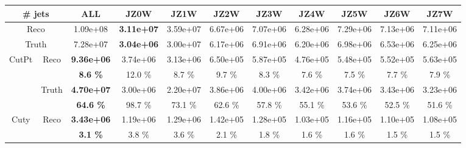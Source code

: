 \begin{appendices}
\begin{landscape} 
\begin{table}
  \small
  \centering
  \begin{tabular}{|c|c|>{\bfseries}c|c|c|c|c|c|c|c|c|}
    \hline
     \multicolumn{2}{|c|}{\# jets}  & ALL      & JZ0W     & JZ1W     & JZ2W     & JZ3W     & JZ4W     & JZ5W     & JZ6W     & JZ7W     \\
    \hline                                                              
    \hline                                                              
     \multicolumn{2}{|c|}{Reco}                               & 1.09e+08 & 3.11e+07 & 3.59e+07 & 6.67e+06 & 7.07e+06 & 6.28e+06 & 7.29e+06 & 7.13e+06 & 7.11e+06 \\
    \hline                                                                                          
     \multicolumn{2}{|c|}{Truth}                                & 7.28e+07 & 3.04e+06 & 3.00e+07 & 6.17e+06 & 6.91e+06 & 6.20e+06 & 6.98e+06 & 6.53e+06 & 6.25e+06 \\
    \hline                                                                                      
    \hline                                                                                      
    \multirow{4}{*}{CutPt}          & \multirow{2}{*}{Reco}   & 9.36e+06 & 3.74e+06 & 3.13e+06 & 6.50e+05 & 5.87e+05 & 4.76e+05 & 5.48e+05 & 5.52e+05 & 5.63e+05 \\
                                    &                           & 8.6 \%   & 12.0 \%  & 8.7 \%   & 9.7 \%   & 8.3 \%   & 7.6 \%   & 7.5 \%   & 7.7 \%   & 7.9 \%   \\
    \cline{2-11}                                                                                
                                    & \multirow{2}{*}{Truth}    & 4.70e+07 & 3.00e+06 & 2.20e+07 & 3.86e+06 & 4.00e+06 & 3.42e+06 & 3.74e+06 & 3.43e+06 & 3.23e+06 \\
                                    &                           & 64.6 \%  & 98.7 \%  & 73.1 \%  & 62.6 \%  & 57.8 \%  & 55.1 \%  & 53.6 \%  & 52.5 \%  & 51.6 \%  \\
    \hline                                                                                      
    \hline                                                                                      
    \multirow{4}{*}{Cuty}           & \multirow{2}{*}{Reco}   & 3.43e+06 & 1.19e+06 & 1.29e+06 & 1.42e+05 & 1.28e+05 & 1.03e+05 & 1.16e+05 & 1.10e+05 & 1.08e+05 \\
                                    &                           & 3.1 \%   & 3.8 \%   & 3.6 \%   & 2.1 \%   & 1.8 \%   & 1.6 \%   & 1.6 \%   & 1.5 \%   & 1.5 \%   \\

\end{tabular}
\end{table}
\end{landscape}
\end{appendices}
